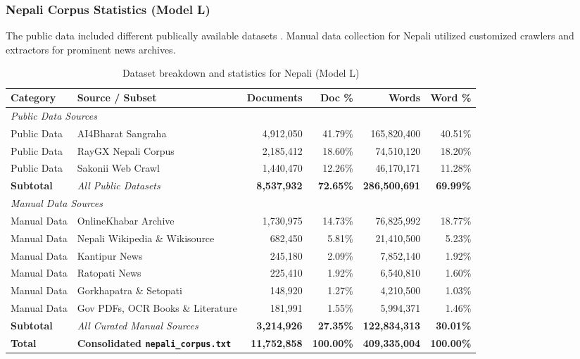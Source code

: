 \documentclass[8pt]{article}
\begin{document}
\subsubsection{Nepali Corpus Statistics (Model L)}
The public data included different publically available datasets .
Manual data collection for Nepali utilized customized crawlers and extractors for prominent news archives.
\begin{table}[!htp]
    \centering
    \footnotesize %
    \setlength{\tabcolsep}{3.5pt} %
    \begin{tabular}{llrrrr}
        \toprule
        \textbf{Category} & \textbf{Source / Subset} & \textbf{Documents} & \textbf{Doc \%} & \textbf{Words} & \textbf{Word \%} \\
        \midrule
        \multicolumn{6}{l}{\textit{Public Data Sources}} \\
        Public Data & AI4Bharat Sangraha & 4,912,050 & 41.79\% & 165,820,400 & 40.51\% \\
        Public Data & RayGX Nepali Corpus & 2,185,412 & 18.60\% & 74,510,120 & 18.20\% \\
        Public Data & Sakonii Web Crawl & 1,440,470 & 12.26\% & 46,170,171 & 11.28\% \\
        \midrule
        \textbf{Subtotal} & \textit{All Public Datasets} & \textbf{8,537,932} & \textbf{72.65\%} & \textbf{286,500,691} & \textbf{69.99\%} \\
        \midrule
        \multicolumn{6}{l}{\textit{Manual Data Sources}} \\
        Manual Data & OnlineKhabar Archive & 1,730,975 & 14.73\% & 76,825,992 & 18.77\% \\
        Manual Data & Nepali Wikipedia \& Wikisource & 682,450 & 5.81\% & 21,410,500 & 5.23\% \\
        Manual Data & Kantipur News & 245,180 & 2.09\% & 7,852,140 & 1.92\% \\
        Manual Data & Ratopati News & 225,410 & 1.92\% & 6,540,810 & 1.60\% \\
        Manual Data & Gorkhapatra \& Setopati & 148,920 & 1.27\% & 4,210,500 & 1.03\% \\
        Manual Data & Gov PDFs, OCR Books \& Literature & 181,991 & 1.55\% & 5,994,371 & 1.46\% \\
        \midrule
        \textbf{Subtotal} & \textit{All Curated Manual Sources} & \textbf{3,214,926} & \textbf{27.35\%} & \textbf{122,834,313} & \textbf{30.01\%} \\
        \midrule
        \textbf{Total} & \textbf{Consolidated \texttt{nepali\_corpus.txt}} & \textbf{11,752,858} & \textbf{100.00\%} & \textbf{409,335,004} & \textbf{100.00\%} \\
        \bottomrule
    \end{tabular}
    \caption{Dataset breakdown and statistics for Nepali (Model L)}
    \label{tab:nepali_stats}
\end{table}
\end{document}
